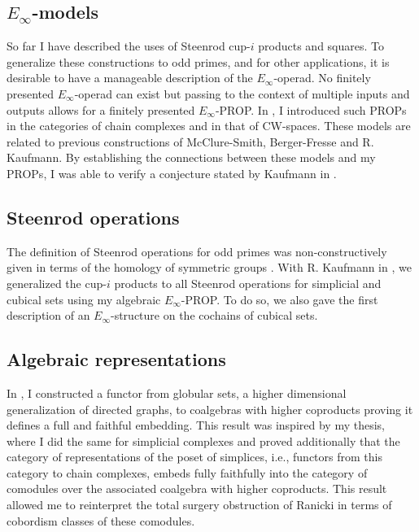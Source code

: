 \subsection{$E_\infty$-models}
So far I have described the uses of Steenrod cup-$i$ products and squares.
To generalize these constructions to odd primes, and for other applications, it is desirable to have a manageable description of the $E_{\infty}$-operad.
No finitely presented $E_\infty$-operad can exist but passing to the context of multiple inputs and outputs allows for a finitely presented $E_\infty$-PROP.
In \cite{medina2020prop1, medina2018prop2}, I introduced such PROPs in the categories of chain complexes and in that of CW-spaces.
These models are related to previous constructions of McClure-Smith, Berger-Fresse and R. Kaufmann.
By establishing the connections between these models and my PROPs, I was able to verify a conjecture stated by Kaufmann in \cite{kaufmann2009dimension}.

\subsection{Steenrod operations} \label{ssec: odd primes}
The definition of Steenrod operations for odd primes was non-constructively given in terms of the homology of symmetric groups \cite{steenrod1952reduced, steenrod1962cohomology}.
With R. Kaufmann in \cite{medina2020maysteenrod}, we generalized the cup-$i$ products to all Steenrod operations for simplicial and cubical sets using my algebraic $E_\infty$-PROP.
To do so, we also gave the first description of an $E_\infty$-structure on the cochains of cubical sets.

\subsection{Algebraic representations}
In \cite{medina2020globular}, I constructed a functor from globular sets, a higher dimensional generalization of directed graphs, to coalgebras with higher coproducts proving it defines a full and faithful embedding.
This result was inspired by my thesis, where I did the same for simplicial complexes and proved additionally that the category of representations of the poset of simplices, i.e., functors from this category to chain complexes, embeds fully faithfully into the category of comodules over the associated coalgebra with higher coproducts.
This result allowed me to reinterpret the total surgery obstruction of Ranicki \cite{ranicki1992topological} in terms of cobordism classes of these comodules.

